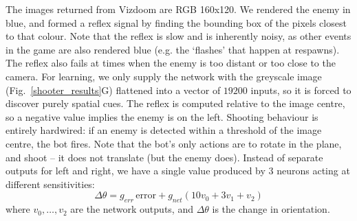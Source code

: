 \documentclass{llncs}
\begin{document}
The images returned from Vizdoom are RGB 160x120. We rendered the
enemy in blue, and formed a reflex signal by finding the bounding box
of the pixels closest to that colour. Note that the reflex is slow and
is inherently noisy, as other events in the game are also rendered
blue (e.g. the ‘flashes’ that happen at respawns). The reflex also
fails at times when the enemy is too distant or too close to the
camera. For learning, we only supply the network with the greyscale
image (Fig.~\ref{shooter_results}G) flattened into a vector of $19200$
inputs, so it is forced to discover purely spatial cues. The reflex is
computed relative to the image centre, so a negative value implies the
enemy is on the left. Shooting behaviour is entirely hardwired: if an
enemy is detected within a threshold of the image centre, the bot
fires. Note that the bot's only actions are to rotate in the plane,
and shoot -- it does not translate (but the enemy does). Instead of
separate outputs for left and right, we have a single value produced
by 3 neurons acting at different sensitivities:
\begin{equation}
\Delta \theta = g_{err}\, \mathrm{error} + g_{net} \left( 10 v_0 + 3 v_1 + v_2 \right)
\end{equation}
where $v_0, \ldots, v_2$ are the network outputs, and $\Delta \theta$
is the change in orientation.
\end{document}
